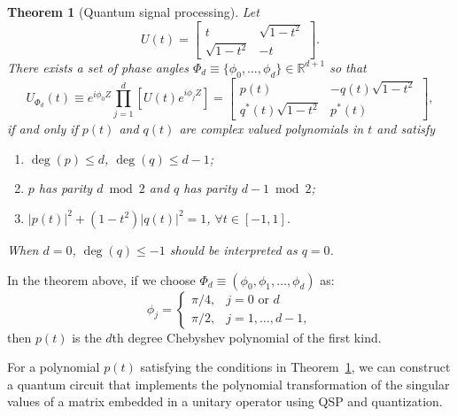 \documentclass{article}
\newtheorem{theorem}{Theorem}[section]
\begin{document}
    \begin{theorem}[Quantum signal processing]
        \label{thm:qsp}
        Let
        \begin{equation}
            U(t) =
            \begin{bmatrix}
                t              & \sqrt{1 - t^2} \\
                \sqrt{1 - t^2} & -t
            \end{bmatrix}.\label{eq:equation15}
        \end{equation}
        There exists a set of phase angles $\Phi_d \equiv \{\phi_0, \ldots, \phi_d\} \in \mathbb{R}^{d+1}$ so that
        \begin{equation}
            U_{\Phi_d}(t) \equiv e^{i\phi_0 Z} \prod_{j=1}^d \left[ U(t) e^{i\phi_j Z} \right] =
            \begin{bmatrix}
                p(t)                 & -q(t)\sqrt{1 - t^2} \\
                q^*(t)\sqrt{1 - t^2} & p^*(t)
            \end{bmatrix},\label{eq:equation16}
        \end{equation}
        if and only if $p(t)$ and $q(t)$ are complex valued polynomials in $t$ and satisfy
        \begin{enumerate}
            \item $\deg(p) \leq d$, $\deg(q) \leq d - 1$;
            \item $p$ has parity $d \bmod 2$ and $q$ has parity $d - 1 \bmod 2$;
            \item $|p(t)|^2 + (1 - t^2)|q(t)|^2 = 1$, $\forall t \in [-1, 1]$.
        \end{enumerate}
        When $d = 0$, $\deg(q) \leq -1$ should be interpreted as $q = 0$.

    \end{theorem}

    In the theorem above, if we choose $\Phi_d \equiv (\phi_0, \phi_1, \ldots, \phi_d)$ as:
    $$
    \phi_j =
    \begin{cases}
        \pi/4, & j = 0 \text{ or } d \\
        \pi/2, & j = 1, \ldots, d-1,
    \end{cases}
    $$
    then $p(t)$ is the $d$th degree Chebyshev polynomial of the first kind.

    For a polynomial $p(t)$ satisfying the conditions in Theorem~\ref{thm:qsp}, we can construct a quantum circuit that implements the polynomial transformation of the singular values of a matrix embedded in a unitary operator using QSP and quantization.
\end{document}
